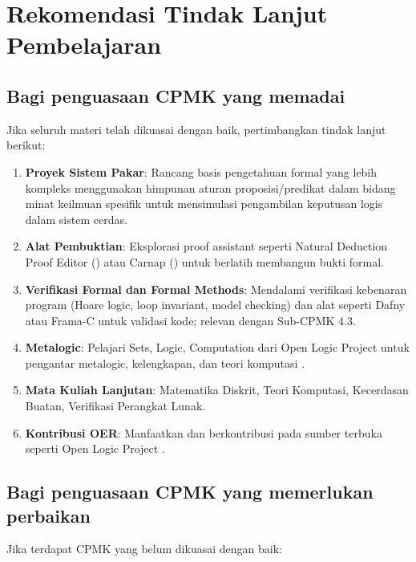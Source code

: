 \section{Rekomendasi Tindak Lanjut Pembelajaran}

\subsection{Bagi penguasaan CPMK yang memadai}

Jika seluruh materi telah dikuasai dengan baik, pertimbangkan tindak lanjut berikut:

\begin{enumerate}
  \item \textbf{Proyek Sistem Pakar}: Rancang basis pengetahuan formal yang lebih kompleks menggunakan himpunan aturan proposisi/predikat dalam bidang minat keilmuan spesifik untuk mensimulasi pengambilan keputusan logis dalam sistem cerdas.
  \item \textbf{Alat Pembuktian}: Eksplorasi proof assistant seperti Natural Deduction Proof Editor (\cite{proofs_checker}) atau Carnap (\cite{carnap}) untuk berlatih membangun bukti formal.
  \item \textbf{Verifikasi Formal dan Formal Methods}: Mendalami verifikasi kebenaran program (Hoare logic, loop invariant, model checking) dan alat seperti Dafny atau Frama-C untuk validasi kode; relevan dengan Sub-CPMK 4.3.
  \item \textbf{Metalogic}: Pelajari Sets, Logic, Computation dari Open Logic Project untuk pengantar metalogic, kelengkapan, dan teori komputasi \cite{setslogic}.
  \item \textbf{Mata Kuliah Lanjutan}: Matematika Diskrit, Teori Komputasi, Kecerdasan Buatan, Verifikasi Perangkat Lunak.
  \item \textbf{Kontribusi OER}: Manfaatkan dan berkontribusi pada sumber terbuka seperti Open Logic Project \cite{openlogic}.
\end{enumerate}

\subsection{Bagi penguasaan CPMK yang memerlukan perbaikan}

Jika terdapat CPMK yang belum dikuasai dengan baik:

